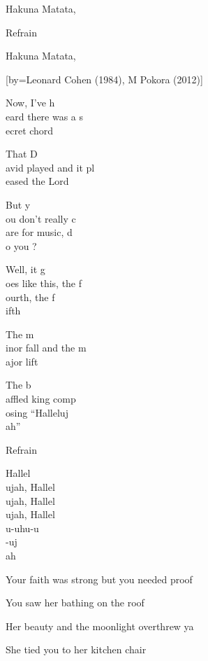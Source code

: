 \beginverse
Hakuna Matata,\\[3x]
\endverse

\beginverse
Refrain
\endverse

\beginverse
Hakuna Matata, \\[3x]
\endverse

[by={Leonard Cohen (1984), M Pokora (2012)}]

\beginverse
Now, I’ve h\\[Sol]eard there was a s\\[Mim]ecret chord
\endverse

\beginverse
That D\\[Sol]avid played and it pl\\[Mim]eased the Lord
\endverse

\beginverse
But y\\[Do]ou don't really c\\[Ré]are for music, d\\[Sol]o you ?\\[Ré]
\endverse

\beginverse
Well, it g\\[Sol]oes like this, the f\\[Do]ourth, the f\\[Ré]ifth
\endverse

\beginverse
The m\\[Mim]inor fall and the m\\[Do]ajor lift
\endverse

\beginverse
The b\\[Ré]affled king comp\\[Si7]osing “Halleluj\\[Mim]ah”
\endverse

\beginverse
Refrain
\endverse

\beginverse
Hallel\\[Do]ujah, Hallel\\[Mim]ujah, Hallel\\[Do]ujah, Hallel\\[Sol]u-uhu-u\\[Ré]-uj\\[Do]ah
\endverse

\beginverse
Your faith was strong but you needed proof
\endverse

\beginverse
You saw her bathing on the roof
\endverse

\beginverse
Her beauty and the moonlight overthrew ya
\endverse

\beginverse
She tied you to her kitchen chair
\endverse

